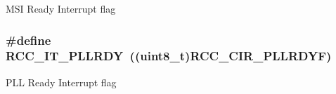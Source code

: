 M\-S\-I Ready Interrupt flag \hypertarget{group___r_c_c___interrupt_ga68d48e7811fb58f2649dce6cf0d823d9}{
\subsubsection[{R\-C\-C\-\_\-\-I\-T\-\_\-\-P\-L\-L\-R\-D\-Y}]{\setlength{\rightskip}{0pt plus 5cm}\#define R\-C\-C\-\_\-\-I\-T\-\_\-\-P\-L\-L\-R\-D\-Y~((uint8\-\_\-t){\bf R\-C\-C\-\_\-\-C\-I\-R\-\_\-\-P\-L\-L\-R\-D\-Y\-F})}}\label{group___r_c_c___interrupt_ga68d48e7811fb58f2649dce6cf0d823d9}
P\-L\-L Ready Interrupt flag 